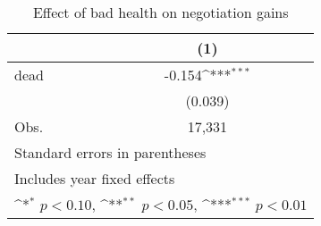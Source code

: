 \begin{table}[htbp]\centering
\def\sym#1{\ifmmode^{#1}\else\(^{#1}\)\fi}
\caption{Effect of bad health on negotiation gains}
\begin{tabular}{l*{1}{c}}
\hline\hline
                    &\multicolumn{1}{c}{(1)}         \\
\hline
dead                &      -0.154\sym{***}\\
                    &     (0.039)         \\
\hline
Obs.                &      17,331         \\
\hline\hline
\multicolumn{2}{l}{\footnotesize Standard errors in parentheses}\\
\multicolumn{2}{l}{\footnotesize Includes year fixed effects}\\
\multicolumn{2}{l}{\footnotesize \sym{*} \(p<0.10\), \sym{**} \(p<0.05\), \sym{***} \(p<0.01\)}\\
\end{tabular}
\end{table}
